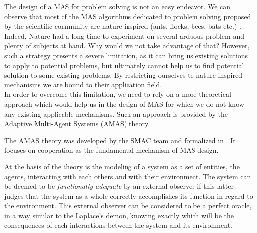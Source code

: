 The design of a MAS for problem solving is not an easy endeavor. We can observe that most of the MAS algorithms dedicated to problem solving proposed by the scientific community are nature-inspired (ants, flocks, bees, bats etc.) \cite{di2011self}. Indeed, Nature had a long time to experiment on several arduous problem and plenty of subjects at hand. Why would we not take advantage of that? However, such a strategy presents a severe limitation, as it can bring us existing solutions to apply to potential problems, but ultimately cannot help us to find potential solution to some existing problems. By restricting ourselves to nature-inspired mechanisms we are bound to their application field.\\

In order to overcome this limitation, we need to rely on a more theoretical approach which would help us in the design of MAS for which we do not know any existing applicable mechanisms. Such an approach is provided by the Adaptive Multi-Agent Systems (AMAS) theory.

The AMAS theory was developed by the SMAC team and formalized in \cite{glize2001adaptation}. It focuses on cooperation as the fundamental mechanism of MAS design.


At the basis of the theory is the modeling of a system as a set of entities, the agents, interacting with each others and with their environment. The system can be deemed to be \emph{functionally adequate} by an external observer if this latter judges that the system as a whole correctly accomplishes its function in regard to the environment. This external observer can be considered to be a perfect oracle, in a way similar to the Laplace's demon, knowing exactly which will be the consequences of each interactions between the system and its environment.

